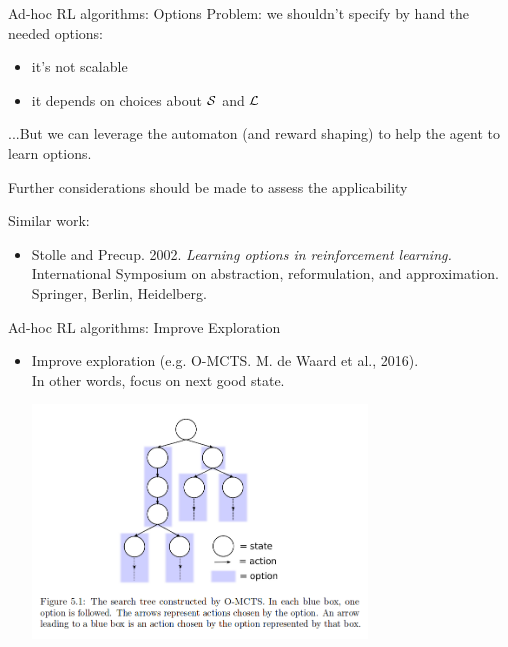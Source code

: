 \documentclass{beamer}
\begin{document}
\begin{frame}{Ad-hoc RL algorithms: Options}
	Problem: we shouldn't specify by hand the needed options:
	\begin{itemize}
		\item it's not scalable
		\item it depends on choices about $\S$ and $\L$
	\end{itemize}
	
	\vspace{0.3cm}
	...But we can leverage the automaton (and reward shaping) to help the agent to learn options.
	
	Further considerations should be made to assess the applicability
	
	\vspace{0.3cm}
	Similar work:
	\begin{itemize}
		\item Stolle and Precup. 2002. \emph{Learning options in reinforcement learning.} International Symposium on abstraction, reformulation, and approximation. Springer, Berlin, Heidelberg.
	\end{itemize}
	
\end{frame}

\begin{frame}{Ad-hoc RL algorithms: Improve Exploration}
	\begin{itemize}
		\item Improve exploration (e.g. O-MCTS. M. de Waard et al., 2016).\\ In other words, focus on next good \DFA state.
			
			\begin{center}
			\includegraphics[width=0.7\textwidth]{images/o-mcts}
			\end{center}
			
	\end{itemize}
\end{frame}
\end{document}
